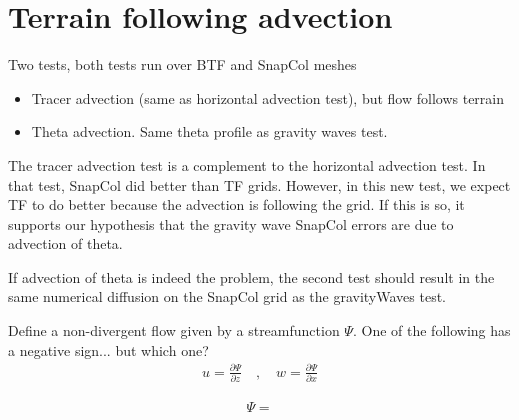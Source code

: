 \section{Terrain following advection}

Two tests, both tests run over BTF and SnapCol meshes
\begin{itemize}
\item Tracer advection (same as horizontal advection test), but flow follows terrain
\item Theta advection.  Same theta profile as gravity waves test.  
\end{itemize}

The tracer advection test is a complement to the horizontal advection test.  In that test, SnapCol did better than TF grids.  However, in this new test, we expect TF to do better because the advection is following the grid.  If this is so, it supports our hypothesis that the gravity wave SnapCol errors are due to advection of theta.

If advection of theta is indeed the problem, the second test should result in the same numerical diffusion on the SnapCol grid as the gravityWaves test.

Define a non-divergent flow given by a streamfunction $\Psi$.  One of the following has a negative sign... but which one?
\begin{align}
u = \frac{\partial \Psi}{\partial z} \quad,\quad w = \frac{\partial \Psi}{\partial x}
\end{align}

\begin{align}
\Psi = 
\end{align}
